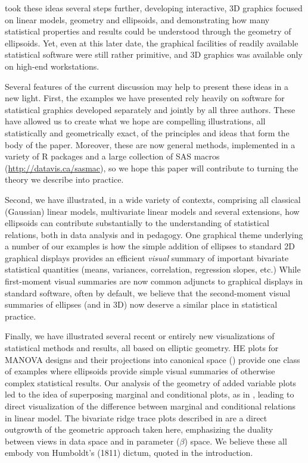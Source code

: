 \citet{Monette:90}
took these ideas several steps further, developing interactive, 3D graphics focused on linear
models, geometry and ellipsoids, and demonstrating how many statistical properties
and results could be understood through the geometry of ellipsoids.  Yet, even at this
later date, the graphical facilities of readily available statistical software were still
rather primitive, and 3D graphics was available only on high-end workstations.
 

Several features of the current discussion may help to present these ideas in a
new light.  First, the examples we have presented rely heavily on software for 
statistical graphics developed separately and jointly by all three authors.
These have allowed us to create what we hope are compelling illustrations,
all statistically and geometrically exact, of the principles and ideas that
form the body of the paper.  Moreover, these are now general methods, implemented
in a variety of R packages
\citep{car,heplots1}
and a large collection of SAS macros (\url{http://datavis.ca/sasmac}),
so we hope this paper will contribute to turning the theory we describe
into practice.

Second, we have illustrated, in a wide variety of contexts,
comprising all classical (Gaussian) linear models, multivariate linear models
and several extensions,
how ellipsoids can contribute substantially to the understanding of statistical
relations, both in data analysis and in pedagogy.  One graphical theme underlying
a number of our examples is how the simple addition of ellipses to standard 2D graphical
displays provides an efficient \emph{visual} summary of important bivariate
statistical quantities (means, variances, correlation, regression slopes, etc.)
While first-moment visual summaries are now common adjuncts to graphical displays
in standard software, often by default, we believe that the second-moment visual summaries
of ellipses (and in 3D)
now deserve a similar place in statistical practice. 

Finally, we have illustrated several recent or entirely new visualizations of 
statistical methods and results, all based on elliptic geometry.
HE plots for MANOVA designs \citep{Friendly:07:manova}
and their projections into canonical space ()
provide one class of examples where ellipsoids provide simple visual summaries of
otherwise complex statistical results.
Our analysis of the geometry of added variable plots led to the idea of superposing
marginal and conditional plots, as in , leading to
direct visualization of the difference between marginal and conditional relations
in linear model.
The bivariate ridge trace plots described in  are a direct outgrowth
of the geometric approach taken here, emphasizing the duality between views in data
space and in parameter ($\beta$) space.
We believe these all embody von Humboldt's (1811) dictum, quoted in the introduction.






